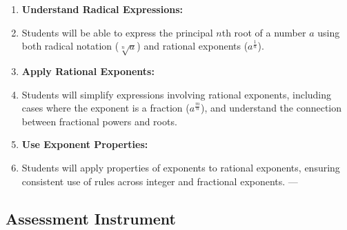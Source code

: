 \begin{enumerate}
    \item \textbf{Understand Radical Expressions:}
    \item Students will be able to express the principal $n$th root of a number $a$ using both radical notation ($\sqrt[n]{a}$) and rational exponents ($a^{\frac{1}{n}}$).
    \item \textbf{Apply Rational Exponents:}
    \item Students will simplify expressions involving rational exponents, including cases where the exponent is a fraction ($a^{\frac{m}{n}}$), and understand the connection between fractional powers and roots.
    \item \textbf{Use Exponent Properties:}
    \item Students will apply properties of exponents to rational exponents, ensuring consistent use of rules across integer and fractional exponents. ---
\end{enumerate}

\subsection{Assessment Instrument}


